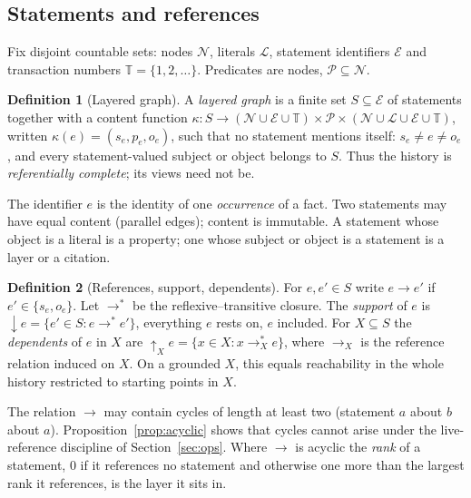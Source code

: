 \documentclass[11pt]{article}
\theoremstyle{plain}
\theoremstyle{definition}
\newtheorem{definition}{Definition}
\theoremstyle{remark}
\newcommand{\Stmt}{\mathcal{E}}          %
\newcommand{\Node}{\mathcal{N}}          %
\newcommand{\Lit}{\mathcal{L}}           %
\newcommand{\Pred}{\mathcal{P}}          %
\newcommand{\TT}{\mathbb{T}}             %
\newcommand{\refs}{\rightarrow}          %
\newcommand{\supp}{{\downarrow}}          %
\newcommand{\dep}{{\uparrow}}            %
\begin{document}
\subsection{Statements and references}

Fix disjoint countable sets: nodes $\Node$, literals $\Lit$, statement
identifiers $\Stmt$ and transaction numbers $\TT=\{1,2,\dots\}$. Predicates are
nodes, $\Pred\subseteq\Node$.

\begin{definition}[Layered graph]\label{def:lg}
A \emph{layered graph} is a finite set $S\subseteq\Stmt$ of statements together
with a content function $\kappa\colon S\to(\Node\cup\Stmt\cup\TT)\times\Pred\times(\Node\cup\Lit\cup\Stmt\cup\TT)$,
written $\kappa(e)=(s_e,p_e,o_e)$, such that no statement mentions itself:
$s_e\neq e\neq o_e$, and every statement-valued subject or object belongs
to $S$. Thus the history is \emph{referentially complete}; its views need not be.
\end{definition}

The identifier $e$ is the identity of one \emph{occurrence} of a fact. Two
statements may have equal content (parallel edges); content is immutable. A
statement whose object is a literal is a property; one whose subject or object
is a statement is a layer or a citation.

\begin{definition}[References, support, dependents]
For $e,e'\in S$ write $e\refs e'$ if $e'\in\{s_e,o_e\}$. Let $\refs^{*}$ be the
reflexive--transitive closure. The \emph{support} of $e$ is
$\supp e=\{e'\in S : e\refs^{*}e'\}$, everything $e$ rests on, $e$ included. For
$X\subseteq S$ the \emph{dependents} of $e$ in $X$ are
$\dep_X e=\{x\in X : x\refs_X^{*}e\}$, where $\refs_X$ is the
reference relation induced on $X$. On a grounded $X$, this equals reachability
in the whole history restricted to starting points in $X$.
\end{definition}

The relation $\refs$ may contain cycles of length at least two (statement $a$
about $b$ about $a$). Proposition~\ref{prop:acyclic} shows that cycles cannot
arise under the live-reference discipline of Section~\ref{sec:ops}. Where
$\refs$ is acyclic the \emph{rank} of a statement, $0$ if it references no
statement and otherwise one more than the largest rank it references, is the
layer it sits in.
\end{document}
